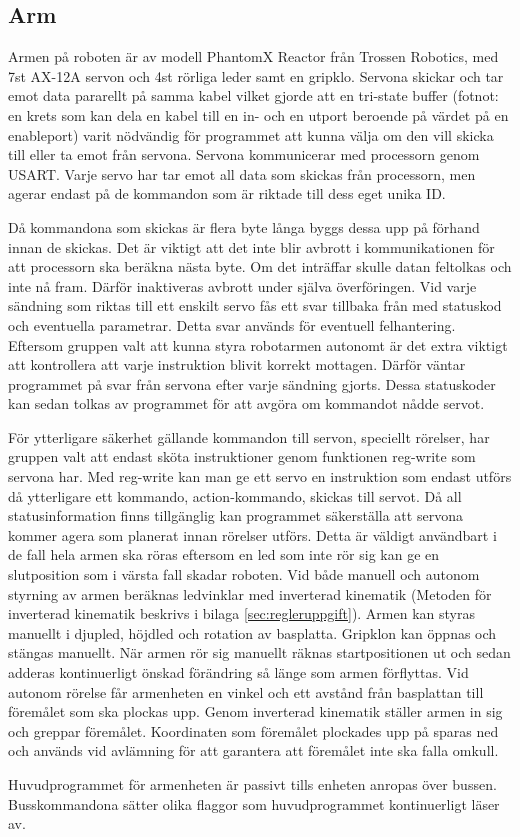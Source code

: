\subsection{Arm}

Armen på roboten är av modell PhantomX Reactor från Trossen Robotics, med 7st AX-12A servon och 4st rörliga leder samt en gripklo. Servona skickar och tar emot data pararellt på samma kabel vilket gjorde att en tri-state buffer (fotnot: en krets som kan dela en kabel till en in- och en utport beroende på värdet på en enableport) varit nödvändig för programmet att kunna välja om den vill skicka till eller ta emot från servona. Servona kommunicerar med processorn genom USART. Varje servo har tar emot all data som skickas från processorn, men agerar endast på de kommandon som är riktade till dess eget unika ID.

Då kommandona som skickas är flera byte långa byggs dessa upp på förhand innan de skickas. Det är viktigt att det inte blir avbrott i kommunikationen för att processorn ska beräkna nästa byte. Om det inträffar skulle datan feltolkas och inte nå fram. Därför inaktiveras avbrott under själva överföringen. Vid varje sändning som riktas till ett enskilt servo fås ett svar tillbaka från med statuskod och eventuella parametrar. Detta svar används för eventuell felhantering. Eftersom gruppen valt att kunna styra robotarmen autonomt är det extra viktigt att kontrollera att varje instruktion blivit korrekt mottagen. Därför väntar programmet på svar från servona efter varje sändning gjorts. Dessa statuskoder kan sedan tolkas av programmet för att avgöra om kommandot nådde servot.

För ytterligare säkerhet gällande kommandon till servon, speciellt rörelser, har gruppen valt att endast sköta instruktioner genom funktionen reg-write som servona har. Med reg-write kan man ge ett servo en instruktion som endast utförs då ytterligare ett kommando, action-kommando, skickas till servot. Då all statusinformation finns tillgänglig kan programmet säkerställa att servona kommer agera som planerat innan rörelser utförs. Detta är väldigt användbart i de fall hela armen ska röras eftersom en led som inte rör sig kan ge en slutposition som i värsta fall skadar roboten.
Vid både manuell och autonom styrning av armen beräknas ledvinklar med inverterad kinematik (Metoden för inverterad kinematik beskrivs i bilaga \ref{sec:regleruppgift}). Armen kan styras manuellt i djupled, höjdled och rotation av basplatta. Gripklon kan öppnas och stängas manuellt. När armen rör sig manuellt räknas startpositionen ut och sedan adderas kontinuerligt önskad förändring så länge som armen förflyttas. Vid autonom rörelse får armenheten en vinkel och ett avstånd från basplattan till föremålet som ska plockas upp. Genom inverterad kinematik ställer armen in sig och greppar föremålet. Koordinaten som föremålet plockades upp på sparas ned och används vid avlämning för att garantera att föremålet inte ska falla omkull.

Huvudprogrammet för armenheten är passivt tills enheten anropas över bussen. Busskommandona sätter olika flaggor som huvudprogrammet kontinuerligt läser av.
